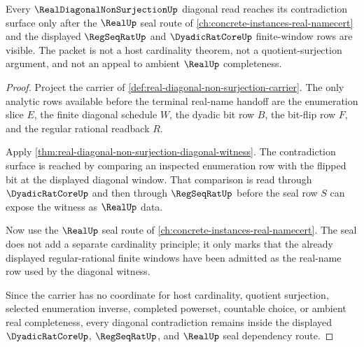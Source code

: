 \begin{theorem}
\label{thm:real-diagonal-non-surjection-real-seal-dependency}
Every $\RealDiagonalNonSurjectionUp$ diagonal read reaches its contradiction
surface only after the $\RealUp$ seal route of
\autoref{ch:concrete-instances-real-namecert} and the displayed
$\RegSeqRatUp$ and $\DyadicRatCoreUp$ finite-window rows are visible. The
packet is not a host cardinality theorem, not a quotient-surjection argument,
and not an appeal to ambient $\RealUp$ completeness.
\end{theorem}
\begin{proof}
Project the carrier of
\autoref{def:real-diagonal-non-surjection-carrier}. The only analytic rows
available before the terminal real-name handoff are the enumeration slice
$E$, the finite diagonal schedule $W$, the dyadic bit row $B$, the bit-flip
row $F$, and the regular rational readback $R$.

Apply \autoref{thm:real-diagonal-non-surjection-diagonal-witness}. The
contradiction surface is reached by comparing an inspected enumeration row
with the flipped bit at the displayed diagonal window. That comparison is
read through $\DyadicRatCoreUp$ and then through $\RegSeqRatUp$ before the
seal row $S$ can expose the witness as $\RealUp$ data.

Now use the $\RealUp$ seal route of
\autoref{ch:concrete-instances-real-namecert}. The seal does not add a
separate cardinality principle; it only marks that the already displayed
regular-rational finite windows have been admitted as the real-name row used
by the diagonal witness.

Since the carrier has no coordinate for host cardinality, quotient
surjection, selected enumeration inverse, completed powerset, countable
choice, or ambient real completeness, every diagonal contradiction remains
inside the displayed $\DyadicRatCoreUp$, $\RegSeqRatUp$, and $\RealUp$ seal
dependency route.
\end{proof}
